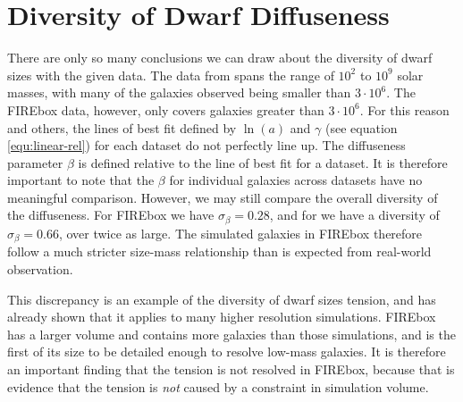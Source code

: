 \section{Diversity of Dwarf Diffuseness}

There are only so many conclusions we can draw about the diversity of dwarf sizes with the given data. The data from \cite{mcconnachieOBSERVEDPROPERTIESDWARF2012} spans the range of $10^2$ to $10^9$ solar masses, with many of the galaxies observed being smaller than $3 \cdot 10^6$. The FIREbox data, however, only covers galaxies greater than $3 \cdot 10^6$. For this reason and others, the lines of best fit defined by $\ln(a)$ and $\gamma$ (see equation \ref{equ:linear-rel}) for each dataset do not perfectly line up. %
The diffuseness parameter $\beta$ is defined relative to the line of best fit for a dataset. It is therefore important to note that the $\beta$ for individual galaxies across datasets have no meaningful comparison. However, we may still compare the overall diversity of the diffuseness. For FIREbox we have $\sigma_\beta = 0.28$, and for \cite{mcconnachieOBSERVEDPROPERTIESDWARF2012} we have a diversity of $\sigma_\beta = 0.66$, over twice as large. The simulated galaxies in FIREbox therefore follow a much stricter size-mass relationship than is expected from real-world observation.

This discrepancy is an example of the diversity of dwarf sizes tension, and \cite{salesBaryonicSolutionsChallenges2022} has already shown that it applies to many higher resolution simulations. FIREbox has a larger volume and contains more galaxies than those simulations, and is the first of its size to be detailed enough to resolve low-mass galaxies. It is therefore an important finding that the tension is not resolved in FIREbox, because that is evidence that the tension is \emph{not} caused by a constraint in simulation volume.


